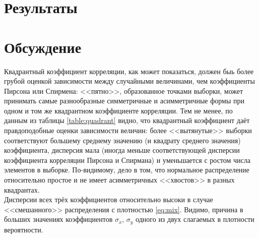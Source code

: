 \documentclass[main.tex]{subfiles}
\begin{document}
\newpage
\section{Результаты}


\newpage
\section{Обсуждение}
Квадрантный коэффициент корреляции, как может показаться, должен быь более грубой оценкой зависимости между случайными величинами, чем коэффициенты Пирсона или Спирмена: <<пятно>>, образованное точками выборки, может принимать самые разнообразные симметричные и асимметричные формы при одном и том же квадрантном коэффициенте корреляции. Тем не менее, по данным из таблицы \ref{table:quadrant} видно, что квадрантный коэффициент даёт правдоподобные оценки зависимости величин: более <<вытянутые>> выборки соответствуют большему среднему значению (и квадрату среднего значения) коэффициента, дисперсия мала (иногда меньше соответствующей дисперсии коэффициента корреляции Пирсона и Спирмана) и уменьшается с ростом числа элементов в выборке. По-видимому, дело в том, что нормальное распределение относительно простое и не имеет асимметричных <<хвостов>> в разных квадрантах.\\
Дисперсии всех трёх коэффициентов относительно высоки в случае <<смешанного>> распределения с плотностью \eqref{eq:mix}. Видимо, причина в больших значениях коэффициентов $\sigma_x$, $\sigma_y$ одного из двух слагаемых в плотности вероятности.
\end{document}
